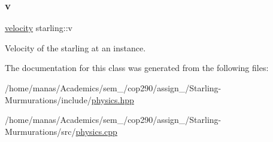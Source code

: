 \subsubsection{\texorpdfstring{v}{v}}
{\footnotesize\ttfamily \mbox{\hyperlink{classvelocity}{velocity}} starling\+::v}



Velocity of the starling at an instance. 



The documentation for this class was generated from the following files\+:\begin{DoxyCompactItemize}
\item 
/home/manas/\+Academics/sem\+\_/cop290/assign\+\_/\+Starling-\/\+Murmurations/include/\mbox{\hyperlink{physics_8hpp}{physics.\+hpp}}\item 
/home/manas/\+Academics/sem\+\_/cop290/assign\+\_/\+Starling-\/\+Murmurations/src/\mbox{\hyperlink{physics_8cpp}{physics.\+cpp}}\end{DoxyCompactItemize}
